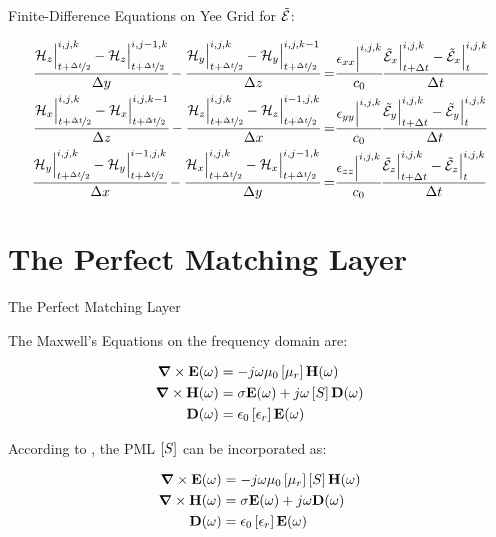 \documentclass{beamer}
\begin{document}
\begin{frame}{Finite-Difference Equations on Yee Grid}
  for $\tilde{\mathcal{E}}$:

  \begin{small}
      \begin{align}
          \cfrac{\mathcal{H}_z\Big|^{i,j,k}_{t+\nicefrac{\Delta t}{2}}-\mathcal{H}_z\Big|^{i,j-1,k}_{t+\nicefrac{\Delta t}{2}}}{\Delta y} - \cfrac{\mathcal{H}_y\Big|^{i,j,k}_{t+\nicefrac{\Delta t}{2}}-\mathcal{H}_y\Big|^{i,j,k-1}_{t+\nicefrac{\Delta t}{2}}}{\Delta z} 
          =&
          \cfrac{\epsilon_{xx}\Big|^{i,j,k}}{c_0}\cfrac{\tilde{\mathcal{E}}_x\Big|^{i,j,k}_{t+\Delta t}-\tilde{\mathcal{E}}_x\Big|^{i,j,k}_{t}}{\Delta t}
          \label{eq:fd_ex}\\
          \cfrac{\mathcal{H}_x\Big|^{i,j,k}_{t+\nicefrac{\Delta t}{2}}-\mathcal{H}_x\Big|^{i,j,k-1}_{t+\nicefrac{\Delta t}{2}}}{\Delta z} - \cfrac{\mathcal{H}_z\Big|^{i,j,k}_{t+\nicefrac{\Delta t}{2}}-\mathcal{H}_z\Big|^{i-1,j,k}_{t+\nicefrac{\Delta t}{2}}}{\Delta x}  =&
          \cfrac{\epsilon_{yy}\Big|^{i,j,k}}{c_0}\cfrac{\tilde{\mathcal{E}}_y\Big|^{i,j,k}_{t+\Delta t}-\tilde{\mathcal{E}}_y\Big|^{i,j,k}_{t}}{\Delta t}
          \label{eq:fd_ey}\\
          \cfrac{\mathcal{H}_y\Big|^{i,j,k}_{t+\nicefrac{\Delta t}{2}}-\mathcal{H}_y\Big|^{i-1,j,k}_{t+\nicefrac{\Delta t}{2}}}{\Delta x} - \cfrac{\mathcal{H}_x\Big|^{i,j,k}_{t+\nicefrac{\Delta t}{2}}-\mathcal{H}_x\Big|^{i,j-1,k}_{t+\nicefrac{\Delta t}{2}}}{\Delta y} 
          =&
          \cfrac{\epsilon_{zz}\Big|^{i,j,k}}{c_0}\cfrac{\tilde{\mathcal{E}}_z\Big|^{i,j,k}_{t+\Delta t}-\tilde{\mathcal{E}}_z\Big|^{i,j,k}_{t}}{\Delta t}
          \label{eq:fd_ez}
      \end{align}
  \end{small}
\end{frame}

\section{The Perfect Matching Layer}
\begin{frame}{The Perfect Matching Layer}
  
  The Maxwell's Equations on the frequency domain are:

  \begin{align}
    \rot \E (\omega) &= -j\omega \mu_0 \brackets{\mu_r} \Hh (\omega) \\
    \rot \Hh (\omega) &= \sigma \E(\omega) + j\omega\brackets{S} \D (\omega) \\
    \D (\omega) &= \epsilon_0 \brackets{\epsilon _r}\E (\omega)
  \end{align}

  According to \cite{rumpf_book}, the PML $\brackets{S}$ can be incorporated as:

  \begin{align}
      \rot \E (\omega) &= -j\omega \mu_0 \brackets{\mu_r} \brackets{S} \Hh (\omega) \\
      \rot \Hh (\omega) &= \sigma \E(\omega) + j\omega \D (\omega) \\
      \D (\omega) &= \epsilon_0 \brackets{\epsilon _r} \E (\omega)
  \end{align}

\end{frame}
\end{document}
